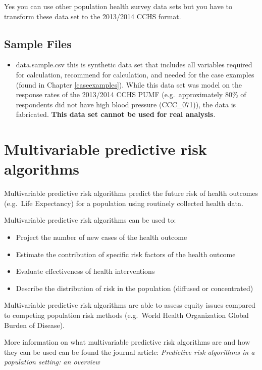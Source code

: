 \documentclass[]{book}
\providecommand{\tightlist}{%
  \setlength{\itemsep}{0pt}\setlength{\parskip}{0pt}}
\begin{document}
Yes you can use other population health survey data sets but you have to transform these data set to the 2013/2014 CCHS format.

\hypertarget{sample-files}{%
\subsection{Sample Files}\label{sample-files}}

\begin{itemize}
\tightlist
\item
  data.sample.csv this is synthetic data set that includes all variables required for calculation, recommend for calculation, and needed for the case examples (found in Chapter \ref{caseexamples}). While this data set was model on the response rates of the 2013/2014 CCHS PUMF (e.g.~approximately 80\% of respondents did not have high blood pressure (CCC\_071)), the data is fabricated. \textbf{This data set cannot be used for real analysis}.
\end{itemize}

\hypertarget{multivariable-predictive-risk-algorithms}{%
\section{Multivariable predictive risk algorithms}\label{multivariable-predictive-risk-algorithms}}

Multivariable predictive risk algorithms predict the future risk of health outcomes (e.g.~Life Expectancy) for a population using routinely collected health data.

Multivariable predictive risk algorithms can be used to:

\begin{itemize}
\tightlist
\item
  Project the number of new cases of the health outcome
\item
  Estimate the contribution of specific risk factors of the health outcome
\item
  Evaluate effectiveness of health interventions
\item
  Describe the distribution of risk in the population (diffused or concentrated)
\end{itemize}

Multivariable predictive risk algorithms are able to assess equity issues compared to competing population risk methods (e.g.~World Health Organization Global Burden of Disease).

More information on what multivariable predictive risk algorithms are and how they can be used can be found the journal article: \emph{Predictive risk algorithms in a population setting: an overview} \citep{PoRTover}
\end{document}
